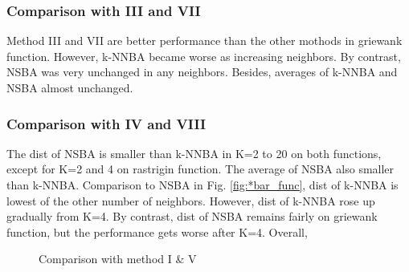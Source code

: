 \documentclass{ies2018}
\begin{document}
\subsubsection{Comparison with III and VII}
Method III and VII are better performance than the other mothods in griewank function.
However, k-NNBA became worse as increasing neighbors. By contrast, NSBA was very unchanged in any neighbors. Besides, averages of k-NNBA and NSBA almost unchanged.  

 \subsubsection{Comparison with IV and VIII}
The dist of NSBA is smaller than k-NNBA in K=2 to 20 on both functions, except for K=2 and 4 on rastrigin function. The average of NSBA also smaller than k-NNBA. 
 Comparison to NSBA in Fig. \ref{fig:*bar_func}, dist of k-NNBA is lowest of the other number of neighbors. However, dist of k-NNBA rose up gradually from K=4. By contrast, dist of NSBA remains fairly on griewank function, but the performance gets worse after K=4. Overall, 

\begin{figure}[p]
\centering
{}

\caption{Comparison with method I \& V}
\label{fig:r*bar_func}
\end{figure}
\end{document}

